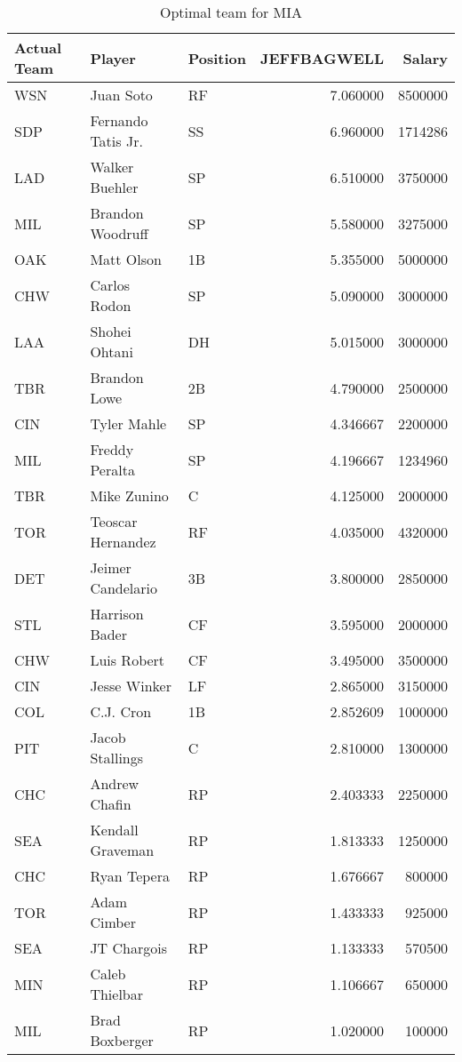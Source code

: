 \begin{table}

\caption{Optimal team for MIA}
\centering
\begin{tabular}[t]{l|l|l|r|r}
\hline
Actual Team & Player & Position & JEFFBAGWELL & Salary\\
\hline
WSN & Juan Soto & RF & 7.060000 & 8500000\\
\hline
SDP & Fernando Tatis Jr. & SS & 6.960000 & 1714286\\
\hline
LAD & Walker Buehler & SP & 6.510000 & 3750000\\
\hline
MIL & Brandon Woodruff & SP & 5.580000 & 3275000\\
\hline
OAK & Matt Olson & 1B & 5.355000 & 5000000\\
\hline
CHW & Carlos Rodon & SP & 5.090000 & 3000000\\
\hline
LAA & Shohei Ohtani & DH & 5.015000 & 3000000\\
\hline
TBR & Brandon Lowe & 2B & 4.790000 & 2500000\\
\hline
CIN & Tyler Mahle & SP & 4.346667 & 2200000\\
\hline
MIL & Freddy Peralta & SP & 4.196667 & 1234960\\
\hline
TBR & Mike Zunino & C & 4.125000 & 2000000\\
\hline
TOR & Teoscar Hernandez & RF & 4.035000 & 4320000\\
\hline
DET & Jeimer Candelario & 3B & 3.800000 & 2850000\\
\hline
STL & Harrison Bader & CF & 3.595000 & 2000000\\
\hline
CHW & Luis Robert & CF & 3.495000 & 3500000\\
\hline
CIN & Jesse Winker & LF & 2.865000 & 3150000\\
\hline
COL & C.J. Cron & 1B & 2.852609 & 1000000\\
\hline
PIT & Jacob Stallings & C & 2.810000 & 1300000\\
\hline
CHC & Andrew Chafin & RP & 2.403333 & 2250000\\
\hline
SEA & Kendall Graveman & RP & 1.813333 & 1250000\\
\hline
CHC & Ryan Tepera & RP & 1.676667 & 800000\\
\hline
TOR & Adam Cimber & RP & 1.433333 & 925000\\
\hline
SEA & JT Chargois & RP & 1.133333 & 570500\\
\hline
MIN & Caleb Thielbar & RP & 1.106667 & 650000\\
\hline
MIL & Brad Boxberger & RP & 1.020000 & 100000\\
\hline
\end{tabular}
\end{table}
